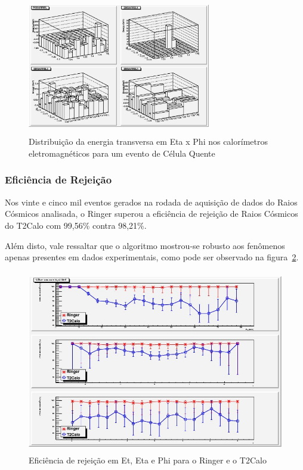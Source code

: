 \documentclass[a4paper,10pt,titlepage]{article}
\begin{document}
\begin{figure}[htbp!]
 \centering
 \includegraphics[width=8cm,height=6cm]{Figs/cosmics/rc_hot_em1.eps}
 \caption{Distribuição da energia transversa em Eta x Phi nos calorímetros eletromagnéticos para um evento de Célula Quente}
 \label{fig:rc_hot_em1}
\end{figure}

\subsubsection{Eficiência de Rejeição}

Nos vinte e cinco mil eventos gerados na rodada de aquisição de dados do Raios Cósmicos analisada, o Ringer superou a eficiência de rejeição de Raios Cósmicos do T2Calo com 99,56\% contra 98,21\%.

Além disto, vale ressaltar que o algoritmo mostrou-se robusto aos fenômenos apenas presentes em dados experimentais, como pode ser observado na figura~\ref{fig:cosmics_rejection_effics}.

\begin{figure}[htbp!]
 \centering
 \includegraphics[width=12cm,height=8cm]{Figs/cosmics/cosmics_rejection_effics.jpg}
 \caption{Eficiência de rejeição em Et, Eta e Phi para o Ringer e o T2Calo}
 \label{fig:cosmics_rejection_effics}
\end{figure}
\end{document}
